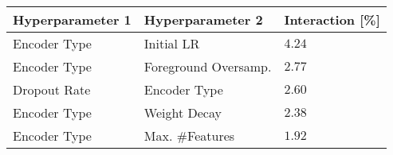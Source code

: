 \begin{tabular}{lll}
\toprule
Hyperparameter 1 & Hyperparameter 2 & Interaction [\%] \\
\midrule
Encoder Type & Initial LR & $4.24$ \\
Encoder Type & Foreground Oversamp. & $2.77$ \\
Dropout Rate & Encoder Type & $2.60$ \\
Encoder Type & Weight Decay & $2.38$ \\
Encoder Type & Max. #Features & $1.92$ \\
\bottomrule
\end{tabular}

